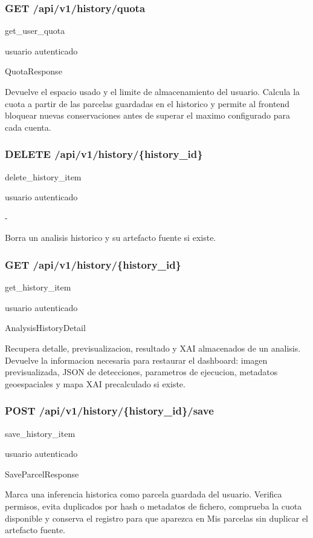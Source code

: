 \subsubsection*{GET /api/v1/history/quota}
\begin{description}[leftmargin=2.8cm,style=nextline]
\item[Handler] get\_user\_quota
\item[Acceso] usuario autenticado
\item[Respuesta] QuotaResponse
\end{description}
Devuelve el espacio usado y el limite de almacenamiento del usuario. Calcula la cuota a partir de las parcelas guardadas en el historico y permite al frontend bloquear nuevas conservaciones antes de superar el maximo configurado para cada cuenta.


\subsubsection*{DELETE /api/v1/history/\{history\_id\}}
\begin{description}[leftmargin=2.8cm,style=nextline]
\item[Handler] delete\_history\_item
\item[Acceso] usuario autenticado
\item[Respuesta] -
\end{description}
Borra un analisis historico y su artefacto fuente si existe.


\subsubsection*{GET /api/v1/history/\{history\_id\}}
\begin{description}[leftmargin=2.8cm,style=nextline]
\item[Handler] get\_history\_item
\item[Acceso] usuario autenticado
\item[Respuesta] AnalysisHistoryDetail
\end{description}
Recupera detalle, previsualizacion, resultado y XAI almacenados de un analisis. Devuelve la informacion necesaria para restaurar el dashboard: imagen previsualizada, JSON de detecciones, parametros de ejecucion, metadatos geoespaciales y mapa XAI precalculado si existe.


\subsubsection*{POST /api/v1/history/\{history\_id\}/save}
\begin{description}[leftmargin=2.8cm,style=nextline]
\item[Handler] save\_history\_item
\item[Acceso] usuario autenticado
\item[Respuesta] SaveParcelResponse
\end{description}
Marca una inferencia historica como parcela guardada del usuario. Verifica permisos, evita duplicados por hash o metadatos de fichero, comprueba la cuota disponible y conserva el registro para que aparezca en Mis parcelas sin duplicar el artefacto fuente.


